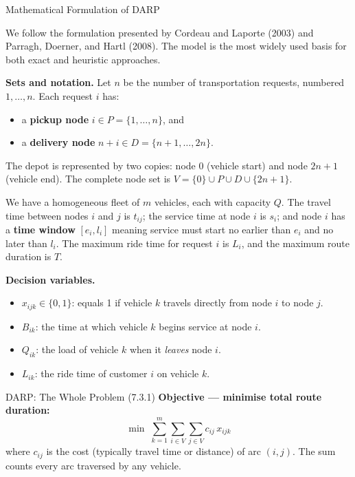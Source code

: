 \documentclass[aspectratio=169,10pt]{beamer}
\begin{document}
\begin{frame}[allowframebreaks]{Mathematical Formulation of DARP}

  We follow the formulation presented by Cordeau and Laporte (2003) and
  Parragh, Doerner, and Hartl (2008).  The model is the most widely used
  basis for both exact and heuristic approaches.

  \textbf{Sets and notation.}  Let $n$ be the number of transportation
  requests, numbered $1, \ldots, n$.  Each request $i$ has:
  \begin{itemize}
    \item a \textbf{pickup node} $i \in P = \{1,\ldots,n\}$, and
    \item a \textbf{delivery node} $n+i \in D = \{n+1,\ldots,2n\}$.
  \end{itemize}
  The depot is represented by two copies: node $0$ (vehicle start) and node
  $2n+1$ (vehicle end).  The complete node set is
  $V = \{0\} \cup P \cup D \cup \{2n+1\}$.

  We have a homogeneous fleet of $m$ vehicles, each with capacity $Q$.  The
  travel time between nodes $i$ and $j$ is $t_{ij}$; the service time at node
  $i$ is $s_i$; and node $i$ has a \textbf{time window} $[e_i, l_i]$ meaning
  service must start no earlier than $e_i$ and no later than $l_i$.  The
  maximum ride time for request $i$ is $L_i$, and the maximum route duration
  is $T$.

  \framebreak

  \textbf{Decision variables.}
  \begin{itemize}
    \item $x_{ijk} \in \{0,1\}$: equals 1 if vehicle $k$ travels directly
          from node $i$ to node $j$.
    \item $B_{ik}$: the time at which vehicle $k$ begins service at node $i$.
    \item $Q_{ik}$: the load of vehicle $k$ when it \emph{leaves} node $i$.
    \item $L_{ik}$: the ride time of customer $i$ on vehicle $k$.
  \end{itemize}

  \framebreak

  \begin{block}{DARP: The Whole Problem (7.3.1)}
    \textbf{Objective — minimise total route duration:}
    \[
      \min \; \sum_{k=1}^{m} \sum_{i \in V} \sum_{j \in V} c_{ij}\, x_{ijk}
    \]
    where $c_{ij}$ is the cost (typically travel time or distance) of arc
    $(i,j)$.  The sum counts every arc traversed by any vehicle.


\end{block}
\end{frame}
\end{document}
